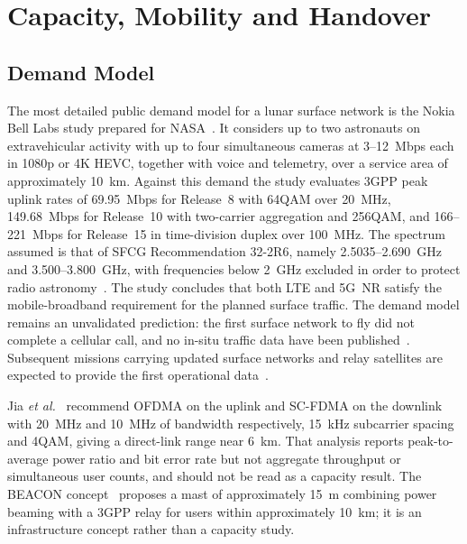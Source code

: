 \documentclass[11pt,a4paper]{article}
\begin{document}
\section{Capacity, Mobility and Handover}
\label{sec:capacity}

\subsection{Demand Model}
The most detailed public demand model for a lunar surface network is the Nokia Bell Labs study prepared for NASA~\cite{nokia_lunar_3gpp}. It considers up to two astronauts on extravehicular activity with up to four simultaneous cameras at \SI{3}{}--\SI{12}{Mbps} each in 1080p or 4K HEVC, together with voice and telemetry, over a service area of approximately \SI{10}{km}. Against this demand the study evaluates 3GPP peak uplink rates of \SI{69.95}{Mbps} for Release~8 with 64QAM over \SI{20}{MHz}, \SI{149.68}{Mbps} for Release~10 with two-carrier aggregation and 256QAM, and \SI{166}{}--\SI{221}{Mbps} for Release~15 in time-division duplex over \SI{100}{MHz}. The spectrum assumed is that of SFCG Recommendation 32-2R6, namely \SI{2.5035}{}--\SI{2.690}{GHz} and \SI{3.500}{}--\SI{3.800}{GHz}, with frequencies below \SI{2}{GHz} excluded in order to protect radio astronomy~\cite{sfcg_rec32}. The study concludes that both LTE and 5G~NR satisfy the mobile-broadband requirement for the planned surface traffic. The demand model remains an unvalidated prediction: the first surface network to fly did not complete a cellular call, and no in-situ traffic data have been published~\cite{nokia_lunar_3gpp}. Subsequent missions carrying updated surface networks and relay satellites are expected to provide the first operational data~\cite{im_ldn_constellation}.

Jia \emph{et al.}~\cite{jia_waveform} recommend OFDMA on the uplink and SC-FDMA on the downlink with \SI{20}{MHz} and \SI{10}{MHz} of bandwidth respectively, \SI{15}{kHz} subcarrier spacing and 4QAM, giving a direct-link range near \SI{6}{km}. That analysis reports peak-to-average power ratio and bit error rate but not aggregate throughput or simultaneous user counts, and should not be read as a capacity result. The BEACON concept~\cite{beacon_demo} proposes a mast of approximately \SI{15}{m} combining power beaming with a 3GPP relay for users within approximately \SI{10}{km}; it is an infrastructure concept rather than a capacity study.
\end{document}
